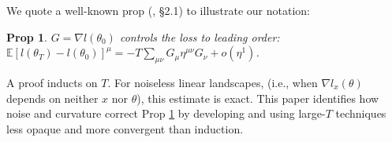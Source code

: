 \documentclass[anon,12pt]{colt2021} %
\newtheorem{prop}{Prop}
\newcommand{\expc}{\mathbb{E}}
\begin{document}
            We quote a well-known prop
            (\cite{ne04}, \S 2.1) to illustrate our notation:
            \begin{prop}\label{prop:nest}
                $G = \nabla l(\theta_0)$ controls the loss to leading order:
                $
                    \expc[l(\theta_T)-l(\theta_0)]^\mu =
                    - 
                    T \sum_{\mu\nu} G_\mu \eta^{\mu\nu} G_\nu
                    + o(\eta^1)
                $.
            \end{prop}
            A proof inducts on $T$.
            For noiseless linear landscapes, (i.e., when $\nabla l_x(\theta)$
            depends on neither $x$ nor $\theta$), this estimate is exact.
            This paper identifies how noise and curvature correct Prop
            \ref{prop:nest} by developing and using large-$T$ techniques less
            opaque and more convergent than induction.
\end{document}
